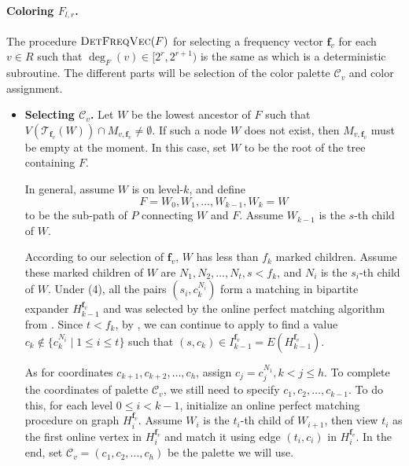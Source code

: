 \documentclass[11pt,a4paper]{article}
\newcommand{\tree}{\mathcal{T}}
\newcommand{\freq}{\mathbf{f}}
\newcommand{\clr}{\mathcal{C}}
\begin{document}
\paragraph*{Coloring $F_{l, r}$.} The procedure $\textsc{DetFreqVec}(F)$\label{alg:detfreqvec} for selecting a frequency vector $\freq_v$ for each $v\in R$ such that $\deg_F(v)\in [2^r, 2^{r+1})$ is the same as  which is a deterministic subroutine. The different parts will be selection of the color palette $\clr_v$ and color assignment.
\begin{itemize}
	\item \textbf{Selecting $\clr_v$.} Let $W$ be the lowest ancestor of $F$ such that $V(\tree_{\freq_v}(W))\cap M_{v, \freq_v}\neq\emptyset$. If such a node $W$ does not exist, then $M_{v, \freq_v}$ must be empty at the moment. In this case, set $W$ to be the root of the tree containing $F$.
	
	In general, assume $W$ is on level-$k$, and define $$F = W_0, W_1, \ldots, W_{k-1}, W_k = W$$ to be the sub-path of $P$ connecting $W$ and $F$. Assume $W_{k-1}$ is the $s$-th child of $W$.
	
	According to our selection of $\freq_v$, $W$ has less than $f_k$ marked children. Assume these marked children of $W$ are $N_1, N_2, \ldots, N_t, s<f_k$, and $N_i$ is the $s_i$-th child of $W$. Under (4), all the pairs $\left(s_i, c_k^{N_i}\right)$ form a matching in bipartite expander $H_{k-1}^{\freq_v}$ and was selected by the online perfect matching algorithm from . Since $t < f_k$, by , we can continue to apply  to find a value $c_k\notin \{c_k^{N_i} \mid 1\leq i\leq t\}$ such that $(s, c_k)\in I_{k-1}^{\freq_v} = E(H_{k-1}^{\freq_v})$.
	
	As for coordinates $c_{k+1}, c_{k+2}, \ldots, c_h$, assign $c_j = c_j^{N_1}, k<j\leq h$. To complete the coordinates of palette $\clr_v$, we still need to specify $c_1, c_2, \ldots, c_{k-1}$. To do this, for each level $0\leq i < k-1$, initialize an online perfect matching procedure on graph $H_i^{\freq_v}$. Assume $W_i$ is the $t_i$-th child of $W_{i+1}$, then view $t_i$ as the first online vertex in $H_i^{\freq_v}$ and match it using edge $(t_i, c_i)$ in $H_i^{\freq_v}$. In the end, set $\clr_v = (c_1, c_2, \ldots, c_h)$ be the palette we will use.
	

\end{itemize}
\end{document}
